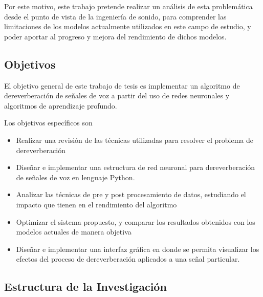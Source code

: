 Por este motivo, este trabajo pretende realizar un análisis de esta problemática desde el punto de vista de la ingeniería de sonido, para comprender las limitaciones de los modelos actualmente utilizados en este campo de estudio, y poder aportar al progreso y mejora del rendimiento de dichos modelos. 

\subsection{Objetivos}
El objetivo general de este trabajo de tesis es implementar un algoritmo de dereverberación de señales de voz a partir del uso de redes neuronales y algoritmos de aprendizaje profundo. 

Los objetivos específicos son 
\begin{itemize}
    \item Realizar una revisión de las técnicas utilizadas para resolver el problema de dereverberación 
    \item Diseñar e implementar una estructura de red neuronal para dereverberación de señales de voz en lenguaje Python.
    \item Analizar las técnicas de pre y post procesamiento de datos, estudiando el impacto que tienen en el rendimiento del algoritmo
    \item Optimizar el sistema propuesto, y comparar los resultados obtenidos con los modelos actuales de manera objetiva
    \item Diseñar e implementar una interfaz gráfica en donde se permita visualizar los efectos del proceso de dereverberación aplicados a una señal particular. 
\end{itemize}

\subsection{Estructura de la Investigación}
